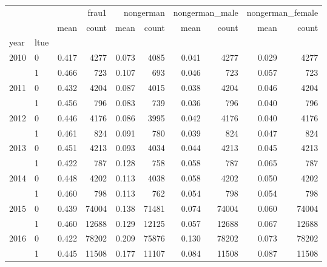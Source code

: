 \begin{tabular}{llrrrrrrrr}
\toprule
 &  & \multicolumn{2}{r}{frau1} & \multicolumn{2}{r}{nongerman} & \multicolumn{2}{r}{nongerman_male} & \multicolumn{2}{r}{nongerman_female} \\
 &  & mean & count & mean & count & mean & count & mean & count \\
year & ltue &  &  &  &  &  &  &  &  \\
\midrule
\multirow[t]{2}{*}{2010} & 0 & 0.417 & 4277 & 0.073 & 4085 & 0.041 & 4277 & 0.029 & 4277 \\
 & 1 & 0.466 & 723 & 0.107 & 693 & 0.046 & 723 & 0.057 & 723 \\
\cline{1-10}
\multirow[t]{2}{*}{2011} & 0 & 0.432 & 4204 & 0.087 & 4015 & 0.038 & 4204 & 0.046 & 4204 \\
 & 1 & 0.456 & 796 & 0.083 & 739 & 0.036 & 796 & 0.040 & 796 \\
\cline{1-10}
\multirow[t]{2}{*}{2012} & 0 & 0.446 & 4176 & 0.086 & 3995 & 0.042 & 4176 & 0.040 & 4176 \\
 & 1 & 0.461 & 824 & 0.091 & 780 & 0.039 & 824 & 0.047 & 824 \\
\cline{1-10}
\multirow[t]{2}{*}{2013} & 0 & 0.451 & 4213 & 0.093 & 4034 & 0.044 & 4213 & 0.045 & 4213 \\
 & 1 & 0.422 & 787 & 0.128 & 758 & 0.058 & 787 & 0.065 & 787 \\
\cline{1-10}
\multirow[t]{2}{*}{2014} & 0 & 0.448 & 4202 & 0.113 & 4038 & 0.058 & 4202 & 0.050 & 4202 \\
 & 1 & 0.460 & 798 & 0.113 & 762 & 0.054 & 798 & 0.054 & 798 \\
\cline{1-10}
\multirow[t]{2}{*}{2015} & 0 & 0.439 & 74004 & 0.138 & 71481 & 0.074 & 74004 & 0.060 & 74004 \\
 & 1 & 0.460 & 12688 & 0.129 & 12125 & 0.057 & 12688 & 0.067 & 12688 \\
\cline{1-10}
\multirow[t]{2}{*}{2016} & 0 & 0.422 & 78202 & 0.209 & 75876 & 0.130 & 78202 & 0.073 & 78202 \\
 & 1 & 0.445 & 11508 & 0.177 & 11107 & 0.084 & 11508 & 0.087 & 11508 \\
\cline{1-10}
\bottomrule
\end{tabular}
